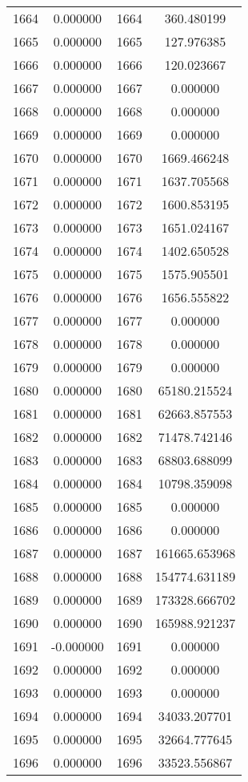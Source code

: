 \documentclass[12pt]{article}
\begin{document}
\begin{longtable}{@{}cccc@{}}
1664 & 0.000000 & 1664 & 360.480199 \\
1665 & 0.000000 & 1665 & 127.976385 \\
1666 & 0.000000 & 1666 & 120.023667 \\
1667 & 0.000000 & 1667 & 0.000000 \\
1668 & 0.000000 & 1668 & 0.000000 \\
1669 & 0.000000 & 1669 & 0.000000 \\
1670 & 0.000000 & 1670 & 1669.466248 \\
1671 & 0.000000 & 1671 & 1637.705568 \\
1672 & 0.000000 & 1672 & 1600.853195 \\
1673 & 0.000000 & 1673 & 1651.024167 \\
1674 & 0.000000 & 1674 & 1402.650528 \\
1675 & 0.000000 & 1675 & 1575.905501 \\
1676 & 0.000000 & 1676 & 1656.555822 \\
1677 & 0.000000 & 1677 & 0.000000 \\
1678 & 0.000000 & 1678 & 0.000000 \\
1679 & 0.000000 & 1679 & 0.000000 \\
1680 & 0.000000 & 1680 & 65180.215524 \\
1681 & 0.000000 & 1681 & 62663.857553 \\
1682 & 0.000000 & 1682 & 71478.742146 \\
1683 & 0.000000 & 1683 & 68803.688099 \\
1684 & 0.000000 & 1684 & 10798.359098 \\
1685 & 0.000000 & 1685 & 0.000000 \\
1686 & 0.000000 & 1686 & 0.000000 \\
1687 & 0.000000 & 1687 & 161665.653968 \\
1688 & 0.000000 & 1688 & 154774.631189 \\
1689 & 0.000000 & 1689 & 173328.666702 \\
1690 & 0.000000 & 1690 & 165988.921237 \\
1691 & -0.000000 & 1691 & 0.000000 \\
1692 & 0.000000 & 1692 & 0.000000 \\
1693 & 0.000000 & 1693 & 0.000000 \\
1694 & 0.000000 & 1694 & 34033.207701 \\
1695 & 0.000000 & 1695 & 32664.777645 \\
1696 & 0.000000 & 1696 & 33523.556867 \\

\end{longtable}
\end{document}
